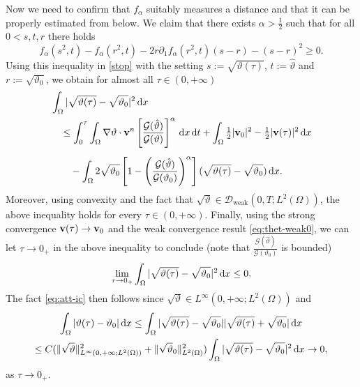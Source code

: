 \documentclass[11pt, a4paper, reqno]{amsart}
\numberwithin{equation}{section}
\newcommand{\thetah}{\hat\thet}
\newcommand{\vc}[1]{{\bf #1}}
\newcommand{\vv}{\vc{v}}
\newcommand{\thet}{\vartheta}
\newcommand{\dt}{\,{\rm d} t }
\newcommand{\dx}{\,{\rm d} {x}}
\newcommand{\dxdt}{\dx  \dt}
\newcommand{\G}{\mathcal{G}}
\newcommand{\al}{\alpha}
\newcommand{\intO}[1]{\int_{\Omega} #1 \dx}
\newcommand{\inttO}[1]{\int_0^{\tau} \int_{\Omega} #1 \dxdt}
\newcommand{\ff}{f}
\newcommand{\nm}[1]{\|#1\|}
\begin{document}
Now we need to confirm that $\ff_\al$ suitably measures a distance and that it can be properly estimated from below. 
We claim that there exists $\alpha > \frac12$ such that for all $0 < s, t, r$ there holds
\begin{equation}\label{zaba}
\ff_\alpha(s^2,t)-\ff_\alpha(r^2,t)-2r\partial_1\ff_\alpha(r^2,t)(s-r) -(s-r)^2 \ge 0.
\end{equation}
Using this inequality in \eqref{stop} with the setting $s:=\sqrt{\thet(\tau)}$, $t:=\thetah$ and $r:=\sqrt{\thet_0}$, 
we obtain for almost all $\tau\in (0,+\infty)$
\begin{equation}\label{stop2}
\begin{split} 
&\intO{|\sqrt{\thet(\tau)} - \sqrt{\thet_0}|^2 }\\
    &\quad \leq \inttO{\nabla\thet \cdot \vv^n \left[\frac{\G(\thetah)}{\G(\thet)}\right]^\al}
      +\intO{\tfrac12|\vv_0|^2-\tfrac12|\vv(\tau)|^2} \\[0.5em]
      &\qquad - \intO{2 \sqrt{\thet_0}\left[1-\left (\frac{\G(\thetah)}{\G(\thet_0)} \right)^\alpha \right](\sqrt{\thet(\tau)}-\sqrt{\thet_0})}.
\end{split}
\end{equation}
Moreover, using convexity and the fact that $\sqrt{\thet}\in \mathcal{D}_{\textrm{weak}}(0,T; L^2(\Omega))$, 
the above inequality holds for every $\tau \in (0,+\infty)$. 
Finally, using the strong convergence $\vv(\tau) \to \vv_0$ and the weak convergence result \eqref{eq:thet-weak0}, 
we can let $\tau \to 0_+$ in the above inequality to conclude 
(note that $\frac{\G(\thetah)}{\G(\thet_0)}$ is bounded)
\begin{equation}\label{stop3}
\lim_{\tau \to 0_+}\intO{|\sqrt{\thet(\tau)} - \sqrt{\thet_0}|^2 }\le 0.
\end{equation}
The fact \eqref{eq:att-ic} then follows since $\sqrt\thet\in L^\infty(0,+\infty;L^2(\Omega))$ and 
\begin{multline*}
  \intO{|\thet(\tau)-\thet_0|}\leq\intO{|\sqrt{\thet(\tau)}-\sqrt{\thet_0}||\sqrt{\thet(\tau)}+\sqrt{\thet_0}|} \\
  \leq C(\nm{\sqrt\thet}_{L^\infty(0,+\infty;L^2(\Omega))}^2+\nm{\sqrt\thet_0}_{L^2(\Omega)}^2)\intO{|\sqrt{\thet(\tau)}-\sqrt{\thet_0}|^2}\to 0,
\end{multline*}
as $\tau \to 0_+$.
\end{document}
